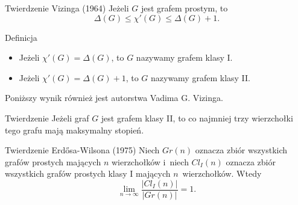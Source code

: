 \documentclass[a4paper,10pt]{beamer}
\begin{document}
\begin{frame}

\begin{block}{Twierdzenie Vizinga (1964)}
 Jeżeli $G$ jest grafem prostym, to
$$\Delta(G)\leqslant\chi'(G)\leqslant\Delta(G)+1.$$
\end{block}


\end{frame}


\begin{frame}


\begin{block}{Definicja}
\begin{itemize}
\item Jeżeli $\chi'(G)=\Delta(G)$, to $G$ nazywamy grafem klasy I.
\item Jeżeli $\chi'(G)=\Delta(G)+1$, to $G$ nazywamy grafem klasy II.
\end{itemize}
\end{block}

\medskip

Poniższy wynik również jest autorstwa Vadima G. Vizinga.

\begin{block}{Twierdzenie}
Jeżeli graf $G$ jest grafem klasy II, to co najmniej trzy wierzchołki tego grafu mają maksymalny stopień.
\end{block}


\end{frame}


\begin{frame}
\begin{block}{Twierdzenie Erd\H{o}sa-Wilsona (1975)}
Niech $Gr(n)$ oznacza zbiór wszystkich grafów prostych mających $n$ wierzchołków i~niech $Cl_I(n)$ oznacza zbiór wszystkich grafów prostych klasy I mających $n$~wierzchołków. Wtedy
$$\lim_{n\to\infty}\frac{|Cl_I(n)|}{|Gr(n)|}=1.$$ 
\end{block}

\end{frame}
\end{document}
